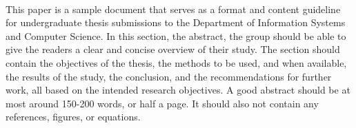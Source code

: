 \begin{thesisabstract}
\paragraph{         }This paper is a sample document that serves as a format and content guideline for undergraduate thesis submissions to the Department of Information Systems and Computer Science. In this section, the abstract, the group should be able to give the readers a clear and concise overview of their study. The section should contain the objectives of the thesis, the methods to be used, and when available, the results of the study, the conclusion, and the recommendations for further work, all based on the intended research objectives. A good abstract should be at most around 150-200 words, or half a page. It should also not contain any references, figures, or equations.
\end{thesisabstract}
